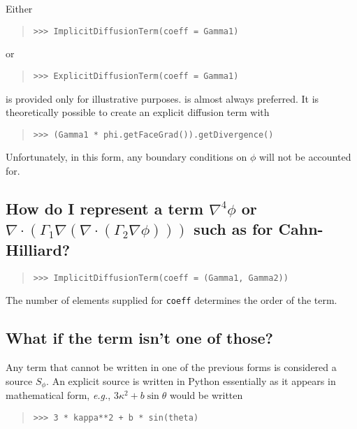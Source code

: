             Either
           \begin{quote}
\begin{verbatim}
>>> ImplicitDiffusionTerm(coeff = Gamma1)
\end{verbatim}
           \end{quote}
           or 
           \begin{quote}
\begin{verbatim}
>>> ExplicitDiffusionTerm(coeff = Gamma1)
\end{verbatim}
           \end{quote}
            is provided only for illustrative purposes.
            is almost always preferred. It is
           theoretically possible to create an explicit diffusion term with
           \begin{quote}
\begin{verbatim}
>>> (Gamma1 * phi.getFaceGrad()).getDivergence()
\end{verbatim}
           \end{quote}
           Unfortunately, in this form, any boundary conditions on $\phi$
           will not be accounted for.

            
           \subsection{How do I represent a term $\nabla^4 \phi$ or
            $\nabla \cdot \left( \Gamma_1 \nabla \left(
            \nabla\cdot\left( 
            \Gamma_2 \nabla \phi\right) \right) \right) $ such as for 
            Cahn-Hilliard?}
            \hspace*{\fill}
            
            \begin{quote}
\begin{verbatim}
>>> ImplicitDiffusionTerm(coeff = (Gamma1, Gamma2))
\end{verbatim}
            \end{quote}
            The number of elements supplied for \verb|coeff| determines the
            order of the term.

            \subsection{What if the term isn't one of those?}
            Any term that cannot be written in one of the previous
            forms is considered a source $S_{\phi}$. An explicit
            source is written in Python essentially as it appears in
            mathematical form, \emph{e.g.}, $3\kappa^2 + b \sin
            \theta$ would be written
            \begin{quote}
\begin{verbatim}
>>> 3 * kappa**2 + b * sin(theta)
\end{verbatim}
            \end{quote}
            

